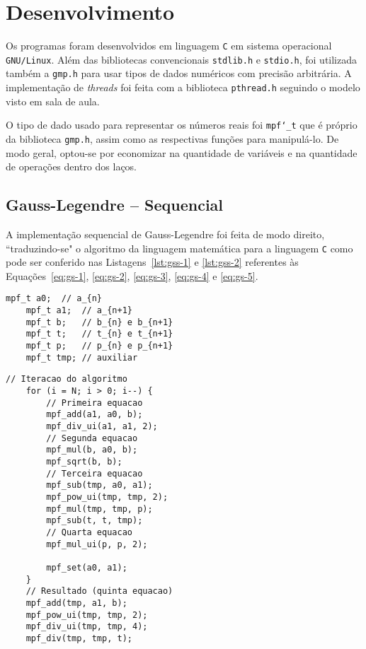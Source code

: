 \section{Desenvolvimento}

Os programas foram desenvolvidos em linguagem \texttt{C} em sistema operacional \texttt{GNU/Linux}. Além das bibliotecas convencionais \texttt{stdlib.h} e \texttt{stdio.h}, foi utilizada também a \texttt{gmp.h} \cite{gmp} para usar tipos de dados numéricos com precisão arbitrária. A implementação de \emph{threads} foi feita com a biblioteca \texttt{pthread.h} seguindo o modelo visto em sala de aula.

O tipo de dado usado para representar os números reais foi \texttt{mpf\char`_t} que é próprio da biblioteca \texttt{gmp.h}, assim como as respectivas funções para manipulá-lo. De modo geral, optou-se por economizar na quantidade de variáveis e na quantidade de operações dentro dos laços.

\subsection{Gauss-Legendre -- Sequencial}

A implementação sequencial de Gauss-Legendre foi feita de modo direito, ``traduzindo-se" o algoritmo da linguagem matemática para a linguagem \texttt{C} como pode ser conferido nas Listagens~\ref{lst:gss-1} e \ref{lst:gss-2} referentes às Equações~\ref{eq:gs-1}, \ref{eq:gs-2}, \ref{eq:gs-3}, \ref{eq:gs-4} e \ref{eq:gs-5}.

\begin{lstlisting}[caption={Gauss-Legendre -- Sequencial: trecho com variáveis.},label={lst:gss-1}]
	mpf_t a0;  // a_{n}
	mpf_t a1;  // a_{n+1}
	mpf_t b;   // b_{n} e b_{n+1}
	mpf_t t;   // t_{n} e t_{n+1}
	mpf_t p;   // p_{n} e p_{n+1}
	mpf_t tmp; // auxiliar
\end{lstlisting}

\begin{lstlisting}[caption={Gauss-Legendre -- Sequencial: trecho com equações.},label={lst:gss-2}]
	// Iteracao do algoritmo
	for (i = N; i > 0; i--) {
		// Primeira equacao
		mpf_add(a1, a0, b);
		mpf_div_ui(a1, a1, 2);
		// Segunda equacao
		mpf_mul(b, a0, b);
		mpf_sqrt(b, b);
		// Terceira equacao
		mpf_sub(tmp, a0, a1);
		mpf_pow_ui(tmp, tmp, 2);
		mpf_mul(tmp, tmp, p);
		mpf_sub(t, t, tmp);
		// Quarta equacao
		mpf_mul_ui(p, p, 2);

		mpf_set(a0, a1);
	}
	// Resultado (quinta equacao)
	mpf_add(tmp, a1, b);
	mpf_pow_ui(tmp, tmp, 2);
	mpf_div_ui(tmp, tmp, 4);
	mpf_div(tmp, tmp, t);
\end{lstlisting}

